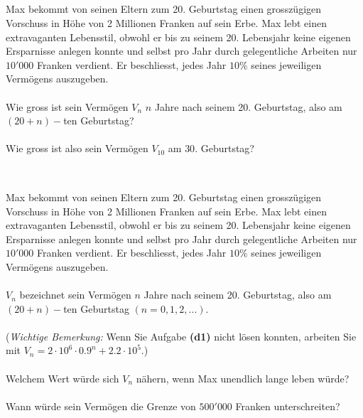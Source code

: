 \subsection*{}
Max bekommt von seinen Eltern zum 20. Geburtstag einen grosszügigen Vorschuss in Höhe von 2 Millionen Franken auf sein Erbe. Max lebt einen extravaganten Lebensstil, obwohl er bis zu seinem 20. Lebensjahr keine eigenen Ersparnisse anlegen konnte und selbst pro Jahr durch gelegentliche Arbeiten nur $ 10'000 $ Franken verdient. Er beschliesst, jedes Jahr $ 10 \% $ seines jeweiligen Vermögens auszugeben.\\
\\
Wie gross ist sein Vermögen $ V_n $ $ n $ Jahre nach seinem 20. Geburtstag, also am $ (20+ n)- $ten Geburtstag?\\
\\
Wie gross ist also sein Vermögen $ V_{10} $ am $ 30. $ Geburtstag?\\
\\
\subsection*{}
Max bekommt von seinen Eltern zum 20. Geburtstag einen grosszügigen Vorschuss in Höhe von 2 Millionen Franken auf sein Erbe. Max lebt einen extravaganten Lebensstil, obwohl er bis zu seinem 20. Lebensjahr keine eigenen Ersparnisse anlegen konnte und selbst pro Jahr durch gelegentliche Arbeiten nur $ 10'000 $ Franken verdient. Er beschliesst, jedes Jahr $ 10 \% $ seines jeweiligen Vermögens auszugeben.\\
\\
$ V_n $ bezeichnet sein Vermögen $ n $ Jahre nach seinem 20. Geburtstag, also am $ (20+n)- $ten Geburtstag $ (n= 0,1,2,...) $.\\
\\
(\textit{Wichtige Bemerkung:} Wenn Sie Aufgabe \textbf{(d1)} nicht lösen konnten, arbeiten Sie mit $ V_n = 2 \cdot 10^6 \cdot 0.9^n+2.2 \cdot 10^5 $.)\\
\\
Welchem Wert würde sich $ V_n $ nähern, wenn Max unendlich lange leben würde?\\
\\
Wann würde sein Vermögen die Grenze von $ 500'000 $ Franken unterschreiten?
\newpage


